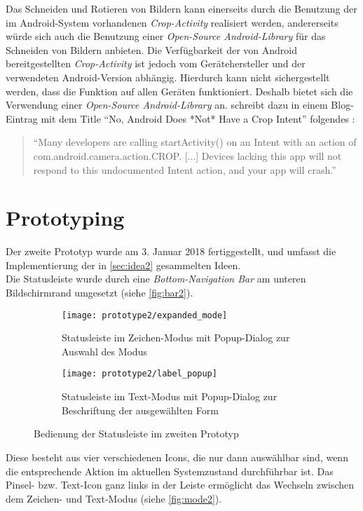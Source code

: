Das Schneiden und Rotieren von Bildern kann einerseits durch die Benutzung der im Android-System vorhandenen \emph{Crop-Activity} realisiert werden, andererseits würde sich auch die Benutzung einer \emph{Open-Source Android-Library} für das Schneiden von Bildern anbieten.
Die Verfügbarkeit der von Android bereitgestellten \emph{Crop-Activity} ist jedoch vom Gerätehersteller und der verwendeten Android-Version abhängig.
Hierdurch kann nicht sichergestellt werden, dass die Funktion auf allen Geräten funktioniert.
Deshalb bietet sich die Verwendung einer \emph{Open-Source Android-Library} an.
\citeauthor{Commonsware13} schreibt dazu in einem Blog-Eintrag mit dem Title ``No, Android Does *Not* Have a Crop Intent'' folgendes \citep{Commonsware13}:
\begin{quote}
  ``Many developers are calling startActivity() on an Intent with an action of com.android.camera.action.CROP.
  [...] Devices lacking this app will not respond to this undocumented Intent action, and your app will crash.'' 
\end{quote}

\section{Prototyping}
Der zweite Prototyp wurde am 3. Januar 2018 fertiggestellt, und umfasst die Implementierung der in \autoref{sec:idea2} gesammelten Ideen. \\

Die Statusleiste wurde durch eine \emph{Bottom-Navigation Bar} am unteren Bildschirmrand umgesetzt (siehe \autoref{fig:bar2}).
\begin{figure}[ht]
  \begin{subfigure}[t]{0.4\textwidth}
    \texttt{[image: prototype2/expanded\_mode]}
    \caption{Statusleiste im Zeichen-Modus mit Popup-Dialog zur Auswahl des Modus}
    \label{fig:mode2}
  \end{subfigure}
  \begin{subfigure}[t]{0.4\textwidth}
    \texttt{[image: prototype2/label\_popup]}
    \caption{Statusleiste im Text-Modus mit Popup-Dialog zur Beschriftung der ausgewählten Form}
    \label{fig:labelp2}
  \end{subfigure}
  \centering
  \caption{Bedienung der Statusleiste im zweiten Prototyp}
  \label{fig:bar2}
\end{figure}
Diese besteht aus vier verschiedenen Icons, die nur dann auswählbar sind, wenn die entsprechende Aktion im aktuellen Systemzustand durchführbar ist.
Das Pinsel- bzw. Text-Icon ganz links in der Leiste ermöglicht das Wechseln zwischen dem Zeichen- und Text-Modus (siehe \autoref{fig:mode2}). \\

